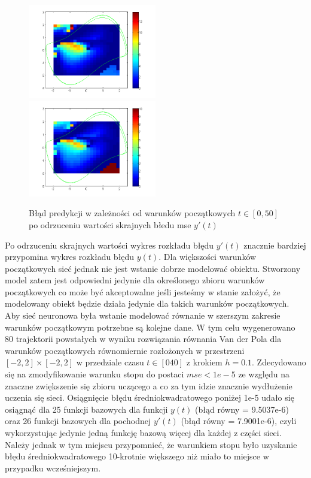 \begin{figure}[ht!]
	\centering

	\subfloat
	{\includegraphics[width=0.5\textwidth]
	{images/figure_signal.png}}
	\subfloat
	{\includegraphics[width=0.5\textwidth]
	{images/figure_deriv_new.png}}	
	

	\caption{Błąd predykcji w zależności od warunków początkowych $t \in [0,50]$ po odrzuceniu wartości skrajnych błedu mse $y'(t)$}
	\label{img:err_initial_new}
\end{figure}

Po odrzuceniu skrajnych wartości wykres rozkładu błędu $y'(t)$ znacznie bardziej przypomina wykres rozkładu błędu $y(t)$. Dla większości warunków początkowych sieć jednak nie jest wstanie dobrze modelować obiektu. Stworzony model zatem jest odpowiedni jedynie dla określonego zbioru warunków początkowych co może być akceptowalne jeśli jesteśmy w stanie założyć, że modelowany obiekt będzie działa jedynie dla takich warunków początkowych. Aby sieć neuronowa była wstanie modelować równanie w szerszym zakresie warunków początkowym potrzebne są kolejne dane. W tym celu wygenerowano 80 trajektorii powstałych w wyniku rozwiązania równania Van der Pola dla warunków początkowych równomiernie rozłożonych w przestrzeni $[-2,2] \times [-2,2]$ w przedziale czasu $t \in [0 40]$ z krokiem $h=0.1$. Zdecydowano się na zmodyfikowanie warunku stopu do postaci $mse < 1e-5$ ze względu na znaczne zwiększenie się zbioru uczącego a co za tym idzie znacznie wydłużenie uczenia się sieci.
Osiągnięcie błędu średniokwadratowego poniżej 1e-5 udało się osiągnąć dla 25 funkcji bazowych dla funkcji $y(t)$ (błąd równy = 9.5037e-6) oraz 26 funkcji bazowych dla pochodnej $y'(t)$ (błąd równy = 7.9001e-6), czyli wykorzystując jedynie jedną funkcję bazową więcej dla każdej z części sieci. Należy jednak w tym miejscu przypomnieć, że warunkiem stopu było uzyskanie błędu średniokwadratowego 10-krotnie większego niż miało to miejsce w przypadku wcześniejszym. 

